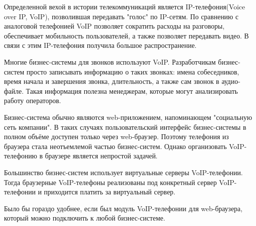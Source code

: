\intro
Определенной вехой в истории телекоммуникаций является IP-телефония(Voice over IP, VoIP), позволившая передавать "голос" по IP-сетям. По сравнению с аналоговой телефонией VoIP позволяет сократить расходы на разговоры, обеспечивает мобильность пользователей, а также позволяет передавать видео. В связи с этим IP-телефония получила большое распространение.

Многие бизнес-системы для звонков используют VoIP. Разработчикам бизнес-систем просто записывать информацию о таких звонках: имена собеседников, время начала и завершения звонка, длительность, а также сам звонок в аудио-файле. Такая информация полезна менеджерам, которые могут анализировать работу операторов.

Бизнес-система обычно являются web-приложением, напоминающем "социальную сеть компании". В таких случаях пользовательский интерфейс бизнес-системы в полном объёме доступен только через web-браузер. Поэтому телефония из браузера стала неотъемлемой частью бизнес-систем. Однако организовать VoIP-телефонию в браузере является непростой задачей.

Большинство бизнес-систем использует виртуальные серверы VoIP-телефонии. Тогда браузерные VoIP-телефоны реализованы под конкретный сервер VoIP-телефонии и приходится платить за виртуальный сервер.

Было бы гораздо удобнее, если был модуль VoIP-телефонии для web-браузера, который можно подключить к любой бизнес-системе.
